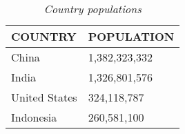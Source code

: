 \begin{singlespace}
    \begin{longtable}{L{7cm}|L{7cm}}
    \caption{\textit{Country populations}}
    \label{tab:table}\\
      \textbf{COUNTRY} & \textbf{POPULATION}\\
      \hline
      \endhead
      China & 1,382,323,332\\
      \hline
      India & 1,326,801,576\\
      \hline
      United States & 324,118,787\\
      \hline
      Indonesia & 260,581,100\\
      \hline
    \end{longtable}
\end{singlespace}